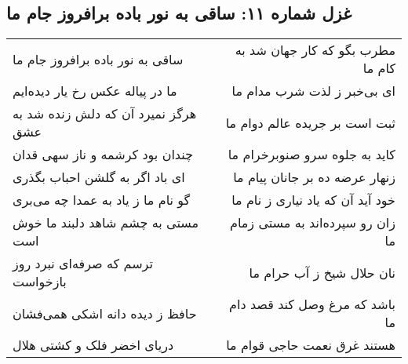\begin{center}
\section*{غزل شماره ۱۱: ساقی به نور باده برافروز جام ما}
\label{sec:sh011}
\begin{longtable}{l p{0.5cm} r}
ساقی به نور باده برافروز جام ما
&&
مطرب بگو که کار جهان شد به کام ما
\\
ما در پیاله عکس رخ یار دیده‌ایم
&&
ای بی‌خبر ز لذت شرب مدام ما
\\
هرگز نمیرد آن که دلش زنده شد به عشق
&&
ثبت است بر جریده عالم دوام ما
\\
چندان بود کرشمه و ناز سهی قدان
&&
کاید به جلوه سرو صنوبرخرام ما
\\
ای باد اگر به گلشن احباب بگذری
&&
زنهار عرضه ده بر جانان پیام ما
\\
گو نام ما ز یاد به عمدا چه می‌بری
&&
خود آید آن که یاد نیاری ز نام ما
\\
مستی به چشم شاهد دلبند ما خوش است
&&
زان رو سپرده‌اند به مستی زمام ما
\\
ترسم که صرفه‌ای نبرد روز بازخواست
&&
نان حلال شیخ ز آب حرام ما
\\
حافظ ز دیده دانه اشکی همی‌فشان
&&
باشد که مرغ وصل کند قصد دام ما
\\
دریای اخضر فلک و کشتی هلال
&&
هستند غرق نعمت حاجی قوام ما
\\
\end{longtable}
\end{center}
